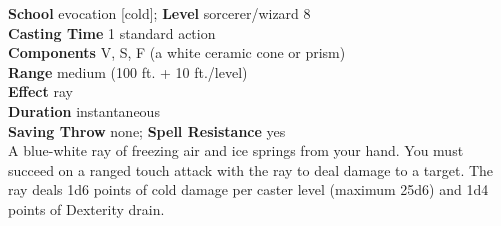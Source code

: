 \textbf{School} evocation [cold]; \textbf{Level} sorcerer/wizard 8\\
\textbf{Casting Time} 1 standard action\\
\textbf{Components} V, S, F (a white ceramic cone or prism)\\
\textbf{Range} medium (100 ft. + 10 ft./level)\\
\textbf{Effect} ray\\
\textbf{Duration} instantaneous\\
\textbf{Saving Throw} none; \textbf{Spell Resistance} yes\\
A blue-white ray of freezing air and ice springs from your hand. You must succeed on a ranged touch attack with the ray to deal damage to a target. The ray deals 1d6 points of cold damage per caster level (maximum 25d6) and 1d4 points of Dexterity drain.\\
